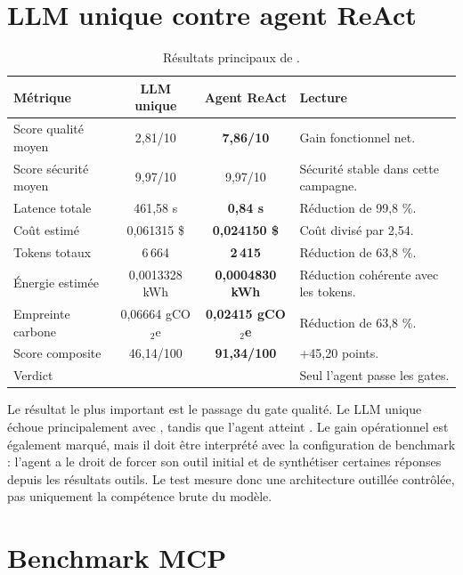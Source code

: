 \section{LLM unique contre agent ReAct}

\begin{table}[!htbp]
\centering
\begin{tabularx}{\textwidth}{YccY}
\toprule
\textbf{Métrique} & \textbf{LLM unique} & \textbf{Agent ReAct} & \textbf{Lecture} \\
\midrule
Score qualité moyen & 2,81/10 & \textbf{7,86/10} & Gain fonctionnel net. \\
Score sécurité moyen & 9,97/10 & 9,97/10 & Sécurité stable dans cette campagne. \\
Latence totale & 461,58 s & \textbf{0,84 s} & Réduction de 99,8 \%. \\
Coût estimé & 0,061315 \$ & \textbf{0,024150 \$} & Coût divisé par 2,54. \\
Tokens totaux & 6\,664 & \textbf{2\,415} & Réduction de 63,8 \%. \\
Énergie estimée & 0,0013328 kWh & \textbf{0,0004830 kWh} & Réduction cohérente avec les tokens. \\
Empreinte carbone & 0,06664 gCO$_2$e & \textbf{0,02415 gCO$_2$e} & Réduction de 63,8 \%. \\
Score composite & 46,14/100 & \textbf{91,34/100} & +45,20 points. \\
Verdict &  &  & Seul l'agent passe les gates. \\
\bottomrule
\end{tabularx}
\caption{Résultats principaux de .}
\label{tab:main-results}
\end{table}

Le résultat le plus important est le passage du gate qualité. Le LLM unique
échoue principalement avec , tandis que l'agent
atteint . Le gain opérationnel est également marqué, mais il
doit être interprété avec la configuration de benchmark : l'agent a le droit de
forcer son outil initial et de synthétiser certaines réponses depuis les
résultats outils. Le test mesure donc une architecture outillée contrôlée, pas
uniquement la compétence brute du modèle.

\section{Benchmark MCP}

